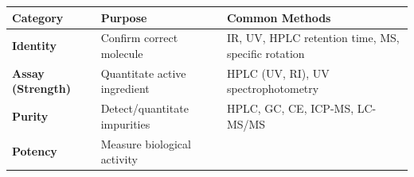 \documentclass[
  11pt,
  a4paper,
]{report}
\begin{document}
\begin{longtable}[]{@{}lll@{}}
\toprule
\begin{minipage}[b]{0.26\columnwidth}\raggedright
Category\strut
\end{minipage} & \begin{minipage}[b]{0.23\columnwidth}\raggedright
Purpose\strut
\end{minipage} & \begin{minipage}[b]{0.42\columnwidth}\raggedright
Common Methods\strut
\end{minipage}\tabularnewline
\midrule
\endhead
\begin{minipage}[t]{0.26\columnwidth}\raggedright
\textbf{Identity}\strut
\end{minipage} & \begin{minipage}[t]{0.23\columnwidth}\raggedright
Confirm correct molecule\strut
\end{minipage} & \begin{minipage}[t]{0.42\columnwidth}\raggedright
IR, UV, HPLC retention time, MS, specific rotation\strut
\end{minipage}\tabularnewline
\begin{minipage}[t]{0.26\columnwidth}\raggedright
\textbf{Assay (Strength)}\strut
\end{minipage} & \begin{minipage}[t]{0.23\columnwidth}\raggedright
Quantitate active ingredient\strut
\end{minipage} & \begin{minipage}[t]{0.42\columnwidth}\raggedright
HPLC (UV, RI), UV spectrophotometry\strut
\end{minipage}\tabularnewline
\begin{minipage}[t]{0.26\columnwidth}\raggedright
\textbf{Purity}\strut
\end{minipage} & \begin{minipage}[t]{0.23\columnwidth}\raggedright
Detect/quantitate impurities\strut
\end{minipage} & \begin{minipage}[t]{0.42\columnwidth}\raggedright
HPLC, GC, CE, ICP-MS, LC-MS/MS\strut
\end{minipage}\tabularnewline
\begin{minipage}[t]{0.26\columnwidth}\raggedright
\textbf{Potency}\strut
\end{minipage} & \begin{minipage}[t]{0.23\columnwidth}\raggedright
Measure biological activity\strut
\end{minipage} & \begin{minipage}[t]{0.42\columnwidth}\raggedright

\end{minipage}
\end{longtable}
\end{document}

